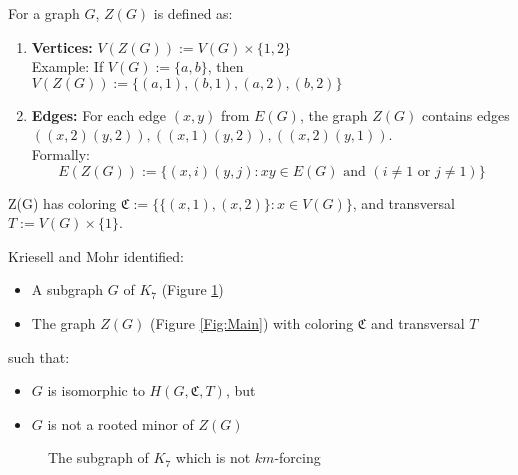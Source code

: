 \begin{defn}[$Z(G)$]
\label{defn:zg}
For a graph $G$, $Z(G)$ is defined as:
    \begin{enumerate}
        \item \textbf{Vertices:} $V(Z(G)) := V(G) \times \{1, 2\}$ \\
 Example: If $V(G):= \{a, b\}$, then $V(Z(G)):= \{(a,1), (b,1), (a,2), (b,2)\}$

        \item \textbf{Edges:} 
 For each edge $(x,y)$ from $E(G)$, the graph $Z(G)$ contains edges $((x,2)(y,2)), ((x,1)(y,2)),
 ((x,2)(y,1))$. \\
 Formally: \[ E(Z(G)) := \{(x,i)(y,j) : xy \in E(G) \text{ and } (i \neq 1 \text{ or } j \neq 1)\} \]
    \end{enumerate}
 Z(G) has coloring $\mathfrak{C} := \{\{(x,1),(x,2)\} : x \in V(G)\}$, and transversal $T := V(G) \times \{1\}$.

\end{defn}


Kriesell and Mohr identified:
\begin{itemize}
\item A subgraph $G$ of $K_7$ (Figure \ref{Fig:counterexample})
\item The graph $Z(G)$ (Figure \ref{Fig:Main}) with coloring $\mathfrak{C}$ and transversal $T$
\end{itemize}
such that:
\begin{itemize}
\item $G$ is isomorphic to $H(G, \mathfrak{C}, T)$, but
\item $G$ is not a rooted minor of $Z(G)$
\end{itemize}

\begin{figure}[H]
    \centering
        \caption{The subgraph of $K_7$ which is not $km$-forcing}
        \label{Fig:counterexample}
\end{figure}





